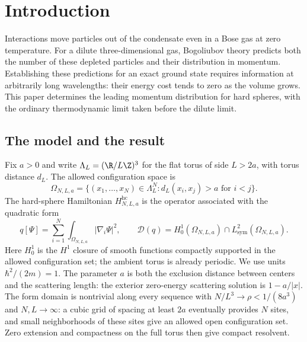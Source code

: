 \section{Introduction}\label{sec:introduction}

Interactions move particles out of the condensate even in a Bose gas at
zero temperature. For a dilute three-dimensional gas, Bogoliubov theory
predicts both the number of these depleted particles and their distribution
in momentum. Establishing these predictions for an exact ground state
requires information at arbitrarily long wavelengths: their energy cost
tends to zero as the volume grows. This paper determines the leading
momentum distribution for hard spheres, with the ordinary thermodynamic
limit taken before the dilute limit.

\subsection{The model and the result}

Fix $a>0$ and write $\Lambda_L=(\R/L\Z)^3$ for the flat torus of side
$L>2a$, with torus distance $d_L$. The allowed configuration space is
\[
 \Omega_{N,L,a}=\{(x_1,\ldots,x_N)\in\Lambda_L^N:
                    d_L(x_i,x_j)>a\text{ for }i<j\}.
\]
The hard-sphere Hamiltonian $H^{\mathrm{hc}}_{N,L,a}$ is the operator
associated with the quadratic form
\[
 q[\Psi]=\sum_{i=1}^N\int_{\Omega_{N,L,a}}|\nabla_i\Psi|^2,
 \qquad
 \mathcal D(q)=H_0^1(\Omega_{N,L,a})\cap L^2_{\mathrm{sym}}(\Omega_{N,L,a}).
\]
Here $H_0^1$ is the $H^1$ closure of smooth functions compactly supported
in the allowed configuration set; the ambient torus is already periodic.
We use units $\hbar^2/(2m)=1$. The parameter
$a$ is both the exclusion distance between centers and the scattering
length: the exterior zero-energy scattering solution is $1-a/|x|$.
The form domain is nontrivial along every sequence with
$N/L^3\to\rho<1/(8a^3)$ and $N,L\to\infty$: a cubic grid of spacing
at least $2a$ eventually provides $N$ sites, and small neighborhoods
of these sites give an allowed open configuration set. Zero extension
and compactness on the full torus then give compact resolvent.

